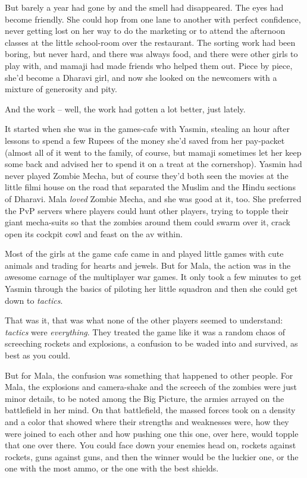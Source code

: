 But barely a year had gone by and the smell had disappeared. The
eyes had become friendly. She could hop from one lane to another
with perfect confidence, never getting lost on her way to do the
marketing or to attend the afternoon classes at the little
school-room over the restaurant. The sorting work had been boring,
but never hard, and there was always food, and there were other
girls to play with, and mamaji had made friends who helped them
out. Piece by piece, she'd become a Dharavi girl, and now she
looked on the newcomers with a mixture of generosity and pity.

And the work -- well, the work had gotten a lot better, just
lately.

It started when she was in the games-cafe with Yasmin, stealing an
hour after lessons to spend a few Rupees of the money she'd saved
from her pay-packet (almost all of it went to the family, of
course, but mamaji sometimes let her keep some back and advised her
to spend it on a treat at the cornershop). Yasmin had never played
Zombie Mecha, but of course they'd both seen the movies at the
little filmi house on the road that separated the Muslim and the
Hindu sections of Dharavi. Mala \emph{loved} Zombie Mecha, and she
was good at it, too. She preferred the PvP servers where players
could hunt other players, trying to topple their giant mecha-suits
so that the zombies around them could swarm over it, crack open its
cockpit cowl and feast on the av within.

Most of the girls at the game cafe came in and played little games
with cute animals and trading for hearts and jewels. But for Mala,
the action was in the awesome carnage of the multiplayer war games.
It only took a few minutes to get Yasmin through the basics of
piloting her little squadron and then she could get down to
\emph{tactics}.

That was it, that was what none of the other players seemed to
understand: \emph{tactics} were \emph{everything}. They treated the
game like it was a random chaos of screeching rockets and
explosions, a confusion to be waded into and survived, as best as
you could.

But for Mala, the confusion was something that happened to other
people. For Mala, the explosions and camera-shake and the screech
of the zombies were just minor details, to be noted among the Big
Picture, the armies arrayed on the battlefield in her mind. On that
battlefield, the massed forces took on a density and a color that
showed where their strengths and weaknesses were, how they were
joined to each other and how pushing one this one, over here, would
topple that one over there. You could face down your enemies head
on, rockets against rockets, guns against guns, and then the winner
would be the luckier one, or the one with the most ammo, or the one
with the best shields.

